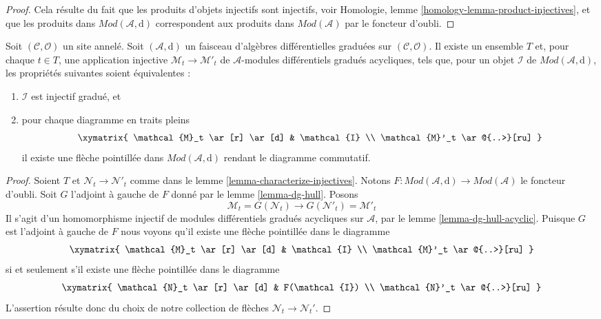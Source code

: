 \begin{proof}
Cela résulte du fait que les produits d'objets injectifs sont injectifs,
voir Homologie, lemme \ref{homology-lemma-product-injectives},
et que les produits
dans $\textit{Mod}(\mathcal{A}, \text{d})$ correspondent
aux produits dans $\textit{Mod}(\mathcal{A})$ par le foncteur d'oubli.
\end{proof}

\begin{lemma}
\label{lemma-characterize-graded-injectives-in-dg} Soit
$(\mathcal{C}, \mathcal{O})$ un site annelé. Soit
$(\mathcal{A}, \text{d})$ un faisceau
d'algèbres différentielles graduées sur $(\mathcal{C}, \mathcal{O})$. Il existe un ensemble
$T$ et, pour chaque $t \in T$, une application injective
$\mathcal{M}_t \to \mathcal{M}'_t$ de
$\mathcal{A}$-modules différentiels gradués acycliques, tels que, pour
un objet $\mathcal{I}$ de $\textit{Mod}(\mathcal{A}, \text{d})$, les propriétés suivantes
soient équivalentes :
\begin{enumerate}
\item $\mathcal{I}$ est injectif gradué, et
\item pour chaque diagramme en traits pleins
$$
\xymatrix{
\mathcal{M}_t \ar[r] \ar[d] & \mathcal{I} \\
\mathcal{M}'_t \ar@{..>}[ru]
}
$$ il
existe une flèche pointillée dans $\textit{Mod}(\mathcal{A}, \text{d})$
rendant le diagramme commutatif.
\end{enumerate}
\end{lemma}

\begin{proof}
Soient $T$ et $\mathcal{N}_t \to \mathcal{N}'_t$ comme dans
le lemme \ref{lemma-characterize-injectives}.
Notons $F : \textit{Mod}(\mathcal{A}, \text{d}) \to \textit{Mod}(\mathcal{A})$ le
foncteur d'oubli. Soit
$G$ l'adjoint à gauche de
$F$ donné par le lemme \ref{lemma-dg-hull}. Posons
$$
\mathcal{M}_t = G(\mathcal{N}_t) \to
G(\mathcal{N}'_t) = \mathcal{M}'_t
$$ Il s'agit d'un
homomorphisme injectif de modules différentiels gradués acycliques
sur $\mathcal{A}$, par le lemme \ref{lemma-dg-hull-acyclic}.
Puisque $G$ est l'adjoint à gauche de $F$ nous voyons
qu'il existe une flèche pointillée dans le
diagramme $$
\xymatrix{
\mathcal{M}_t \ar[r] \ar[d] & \mathcal{I} \\
\mathcal{M}'_t \ar@{..>}[ru]
}
$$
si et seulement s'il existe une flèche pointillée dans
le diagramme $$
\xymatrix{
\mathcal{N}_t \ar[r] \ar[d] & F(\mathcal{I}) \\
\mathcal{N}'_t \ar@{..>}[ru]
}
$$
L'assertion résulte donc du choix de
notre collection de flèches $\mathcal{N}_t \to \mathcal{N}_t'$.
\end{proof}


